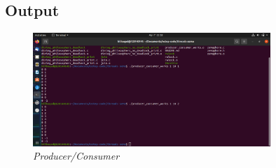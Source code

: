 \documentclass[11pt,a4paper]{article}
\begin{document}
\subsection{Output}
\begin{figure}[h]
	\centering
	\includegraphics[width=0.8\textwidth]{Figure1/produce.png}
	\caption{\textit{Producer/Consumer}}
\end{figure}
\end{document}
